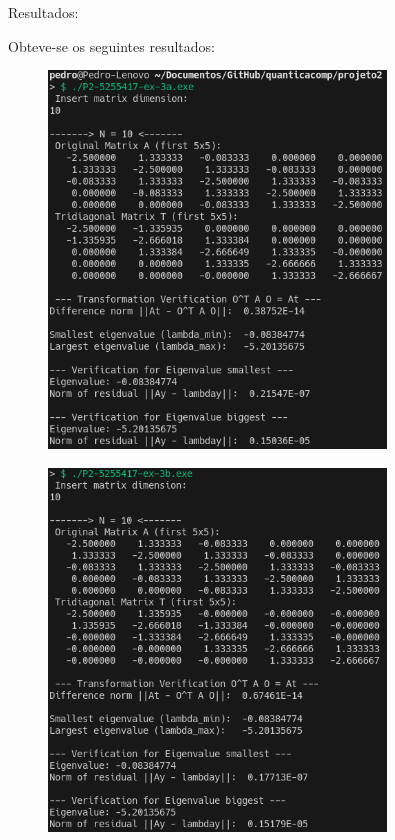 \documentclass[12pt, a4paper]{article} %
\begin{document}
        Resultados:

        Obteve-se os seguintes resultados:
        \begin{figure}[H]
            \centering
            \includegraphics[width=0.8\textwidth]{../images/ex3a-10.png}
        \end{figure}
        \begin{figure}[H]
            \centering
            \includegraphics[width=0.8\textwidth]{../images/ex3b-10.png}
        \end{figure}
\end{document}
